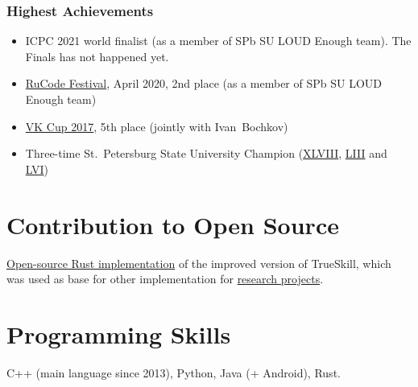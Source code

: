 \documentclass[a4paper, 11pt]{article}
\begin{document}
\subsubsection*{Highest Achievements}

\begin{itemize}
    \item ICPC 2021 world finalist (as a member of SPb SU LOUD Enough team). The Finals has not happened yet.

    \item \href{http://rucode.it-edu.mipt.ru/rucode2020resAB}{RuCode Festival}, April 2020, 2nd place (as a member of SPb SU LOUD Enough team)
    
    \item \href{https://codeforces.com/blog/entry/53192}{VK Cup 2017}, 5th place (jointly with Ivan~Bochkov)
    
    \item Three-time St.~Petersburg State University Champion (\href{https://acm.math.spbu.ru/cgi-bin/monitor.pl/n171015.dat}{XLVIII}, \href{https://acm.math.spbu.ru/cgi-bin/monitor.pl/n190421.dat}{LIII} and \href{https://acm.math.spbu.ru/cgi-bin/monitor.pl/n201206.dat}{LVI})
\end{itemize}

\section*{Contribution to Open Source}

\href{https://github.com/nikgaevoy/SPbTrueSkill}{Open-source Rust implementation} of the improved version of TrueSkill, which was used as base for other implementation for \href{https://arxiv.org/abs/2101.00400}{research projects}.

\section*{Programming Skills}

C++ (main language since 2013), Python, Java (+ Android), Rust.
\end{document}
